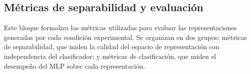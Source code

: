 
\subsection{Métricas de separabilidad y evaluación}
\label{sec:metricas}

Este bloque formaliza las métricas utilizadas para evaluar
las representaciones generadas por cada condición
experimental. Se organizan en dos grupos: métricas de
separabilidad, que miden la calidad del espacio de
representación con independencia del clasificador; y
métricas de clasificación, que miden el desempeño del
MLP sobre cada representación.

